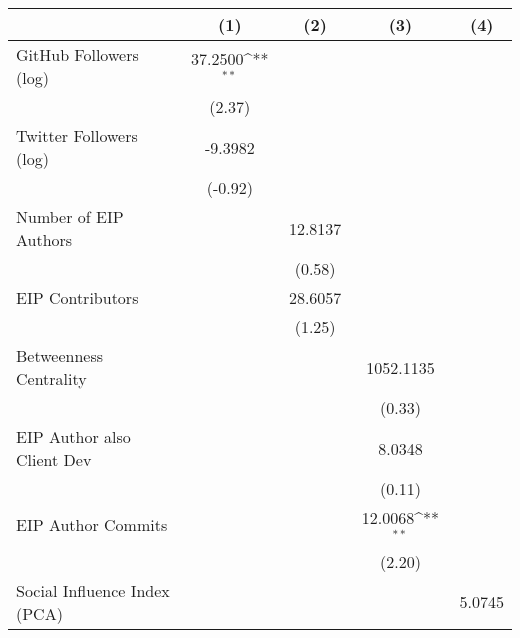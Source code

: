 {
\def\sym#1{\ifmmode^{#1}\else\(^{#1}\)\fi}
\begin{tabular}{l*{4}{c}}
\hline\hline
                                   &\multicolumn{1}{c}{(1)}         &\multicolumn{1}{c}{(2)}         &\multicolumn{1}{c}{(3)}         &\multicolumn{1}{c}{(4)}         \\
\hline
GitHub Followers (log)             &   37.2500\sym{**} &                   &                   &                   \\
                                   &    (2.37)         &                   &                   &                   \\
[1em]
Twitter Followers (log)            &   -9.3982         &                   &                   &                   \\
                                   &   (-0.92)         &                   &                   &                   \\
[1em]
Number of EIP Authors              &                   &   12.8137         &                   &                   \\
                                   &                   &    (0.58)         &                   &                   \\
[1em]
EIP Contributors                   &                   &   28.6057         &                   &                   \\
                                   &                   &    (1.25)         &                   &                   \\
[1em]
Betweenness Centrality             &                   &                   & 1052.1135         &                   \\
                                   &                   &                   &    (0.33)         &                   \\
[1em]
EIP Author also Client Dev         &                   &                   &    8.0348         &                   \\
                                   &                   &                   &    (0.11)         &                   \\
[1em]
EIP Author Commits                 &                   &                   &   12.0068\sym{**} &                   \\
                                   &                   &                   &    (2.20)         &                   \\
[1em]
Social Influence Index (PCA)       &                   &                   &                   &    5.0745         \\

\end{tabular}}
